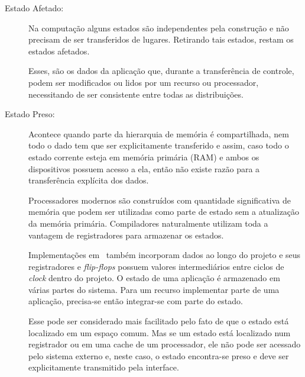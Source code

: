    \begin{description}
      \item [Estado Afetado:]
      Na computação alguns estados são independentes pela construção e não precisam de ser transferidos de lugares. Retirando tais estados, restam os estados afetados.
      
      Esses, são os dados da aplicação que, durante a transferência de controle, podem ser modificados ou lidos por um recurso ou processador, necessitando de ser consistente entre todas as distribuições.
      
      \item [Estado Preso:]
      Acontece quando parte da hierarquia de memória é compartilhada, nem todo o dado tem que ser explicitamente transferido e assim, caso todo o estado corrente esteja em memória primária (RAM) e ambos os dispositivos possuem acesso a ela, então não existe razão para a transferência explícita dos dados.
      
      Processadores modernos são construídos com quantidade significativa de memória que podem ser utilizadas como parte de estado sem a atualização da memória primária.
      Compiladores naturalmente utilizam toda a vantagem de registradores para armazenar os estados.
      
      Implementações em \hardware\ também incorporam dados ao longo do projeto e seus registradores e \textit{flip-flops} possuem valores intermediários entre ciclos de \textit{clock} dentro do projeto.
      O estado de uma aplicação é armazenado em várias partes do sistema.
      Para um recurso implementar parte de uma aplicação, precisa-se então integrar-se com parte do estado.
      
      Esse pode ser considerado mais facilitado pelo fato de que o estado está localizado em um espaço comum. Mas se um estado está localizado num registrador ou em uma cache de um processador, ele não pode ser acessado pelo sistema externo e, neste caso, o estado encontra-se preso e deve ser explicitamente transmitido pela interface.
      

\end{description}
